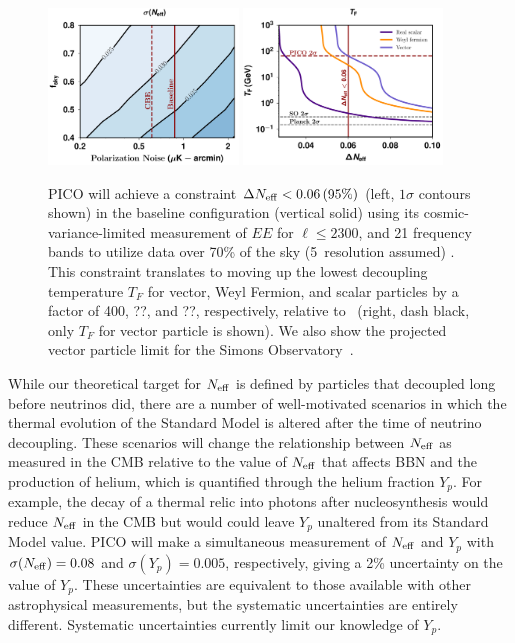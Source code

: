 \documentclass[PICOReport.tex]{subfiles}
\begin{document}
\begin{figure}[t!]
\begin{center}
\includegraphics[width=0.45\textwidth]{images/Neff_final.pdf}
\includegraphics[width=0.47\textwidth]{images/Tf_pico.pdf}
\vspace{-0.15in}
\caption{ \captiontext PICO will achieve a constraint $\Delta {N_{\rm eff}} < 0.06\, (95\%)$ (left, $1\sigma$ contours shown) in the baseline configuration (vertical solid) using its cosmic-variance-limited measurement of $EE$ for $\ell \leq 2300$, and 21 frequency bands to utilize data over 70\% of the sky (5\arcmin\ resolution assumed) . This constraint translates to moving up the lowest decoupling temperature $T_{F}$ for vector, Weyl Fermion, and scalar particles by a factor of 400, ??, and ??, respectively, relative to \planck\ (right, dash black, only $T_{F}$ for vector particle is shown). We also show the projected vector particle limit for the Simons Observatory~\citep{simons_science}. }
\label{fig:Neff_future}  
\end{center}
\vspace{-0.15in}
\end{figure}

While our theoretical target for ${N_{\rm eff}}$ is defined by particles that decoupled long before neutrinos did, there are a number of well-motivated scenarios in which the thermal evolution of the Standard Model is altered after the time of neutrino decoupling.  These scenarios will change the relationship between ${N_{\rm eff}}$ as measured in the CMB relative to the value of ${N_{\rm eff}}$ that affects BBN and the production of helium, which is quantified through the helium fraction $Y_p$.  For example, the decay of a thermal relic into photons after nucleosynthesis would reduce ${N_{\rm eff}}$ in the CMB but would could leave $Y_p$ unaltered from its Standard Model value.  PICO will make a simultaneous measurement of ${N_{\rm eff}}$ and $Y_p$ with $\sigma({N_{\rm eff}}) = 0.08$ and $\sigma(Y_p) =0.005$, respectively, giving a 2\% uncertainty on the value of $Y_p$. These uncertainties are equivalent to those available with other astrophysical measurements, but the systematic uncertainties are entirely different. Systematic uncertainties currently limit our knowledge of $Y_{p}$. 
\end{document}
